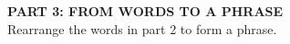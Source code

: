 \begin{center}
\vspace{12pt}
{\Large\bfseries PART 3: FROM WORDS TO A PHRASE}\\[5pt]

Rearrange the words in part 2 to form a phrase.\\[12pt]

\hrulefill
\end{center}
